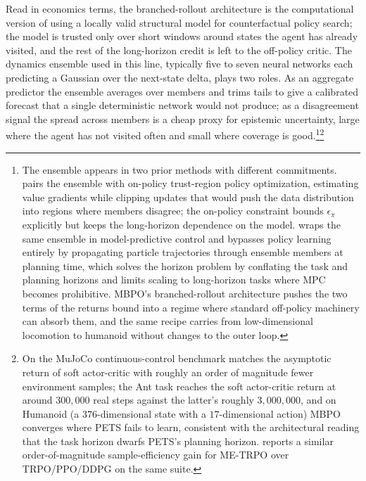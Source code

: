 Read in economics terms, the branched-rollout architecture is the computational version of using a locally valid structural model for counterfactual policy search; the model is trusted only over short windows around states the agent has already visited, and the rest of the long-horizon credit is left to the off-policy critic. The dynamics ensemble used in this line, typically five to seven neural networks each predicting a Gaussian over the next-state delta, plays two roles. As an aggregate predictor the ensemble averages over members and trims tails to give a calibrated forecast that a single deterministic network would not produce; as a disagreement signal the spread across members is a cheap proxy for epistemic uncertainty, large where the agent has not visited often and small where coverage is good.\footnote{The ensemble appears in two prior methods with different commitments. \citet{Kurutach2018} pairs the ensemble with on-policy trust-region policy optimization, estimating value gradients while clipping updates that would push the data distribution into regions where members disagree; the on-policy constraint bounds $\epsilon_\pi$ explicitly but keeps the long-horizon dependence on the model. \citet{Chua2018PETS} wraps the same ensemble in model-predictive control and bypasses policy learning entirely by propagating particle trajectories through ensemble members at planning time, which solves the horizon problem by conflating the task and planning horizons and limits scaling to long-horizon tasks where MPC becomes prohibitive. MBPO's branched-rollout architecture pushes the two terms of the returns bound into a regime where standard off-policy machinery can absorb them, and the same recipe carries from low-dimensional locomotion to humanoid without changes to the outer loop.}\footnote{On the MuJoCo continuous-control benchmark \citet{janner2019model} matches the asymptotic return of soft actor-critic with roughly an order of magnitude fewer environment samples; the Ant task reaches the soft actor-critic return at around $300{,}000$ real steps against the latter's roughly $3{,}000{,}000$, and on Humanoid (a $376$-dimensional state with a $17$-dimensional action) MBPO converges where PETS fails to learn, consistent with the architectural reading that the task horizon dwarfs PETS's planning horizon. \citet{Kurutach2018} reports a similar order-of-magnitude sample-efficiency gain for ME-TRPO over TRPO/PPO/DDPG on the same suite.}
